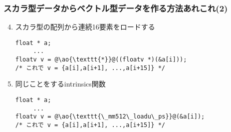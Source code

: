 \documentclass[10pt,dvipdfmx]{beamer}
\newcommand{\ao}[1]{{\color{blue}#1}}
\newcommand{\aka}[1]{{\color{red}#1}}
\begin{document}
\begin{frame}[fragile]
\frametitle{スカラ型データからベクトル型データを作る方法あれこれ(2)}
\begin{enumerate}
   \setcounter{enumi}{3}
 \item スカラ型の配列から連続16要素をロードする
\begin{lstlisting}
float * a;
     ...
floatv v = @\ao{\texttt{*}}@((floatv *)(&a[i]));
/* これで v = {a[i],a[i+1], ...,a[i+15]} */     
\end{lstlisting}

\item 同じことをするintrinsics関数
\begin{lstlisting}
float * a;
     ...
floatv v = @\ao{\texttt{\_mm512\_loadu\_ps}}@(&a[i]);
/* これで v = {a[i],a[i+1], ...,a[i+15]} */
\end{lstlisting}
\end{enumerate}
\end{frame}

\iffalse
\begin{frame}[fragile]
  \frametitle{注意}
  \begin{itemize}
  \item 方法2 \verb+_mm256_set_ps(0,10,20,30,40,50,60,70)+は,
    そのような命令があるわけではなく, 遅い場合が多い.
    全てをメモリに一度ストアして, 方法4でロードしていたりする
    
  \item 方法5の\verb+_mm256_load_ps(&a[i])+
    はアドレスが32の倍数で
    (32バイト境界にalignされてい)なくてはならない, という制限があり,
    それを破るとSegmentation Faultになる. \aka{以降使わない.}
    
  \item 方法4や方法5の\ao{\texttt{\_mm256\_loadu\_ps}}にはそのような制限はなく,
    性能のペナルティもないのでこれを使うのを\ao{推奨}

  \item 方法4で\ao{\texttt{\_mm256\_loadu\_ps}}が使われるのは,
    {\tt floatv}を定義する時に
    {\tt aligned(sizeof(float))}としたため. これを省略すると,
    \ao{\texttt{\_mm256\_load\_ps}}を使われてやっかいなことになる
  \end{itemize}
\end{frame}
\fi
\end{document}
